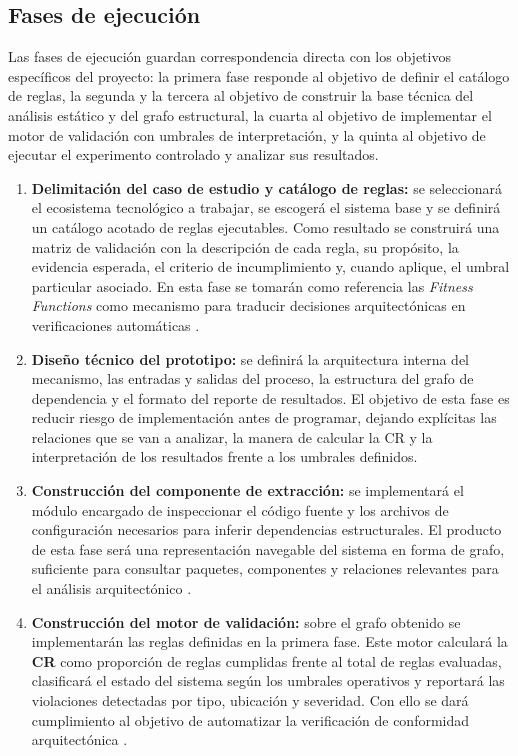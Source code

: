 \subsection{Fases de ejecución}

Las fases de ejecución guardan correspondencia directa con los objetivos específicos del proyecto: la primera fase responde al objetivo de definir el catálogo de reglas, la segunda y la tercera al objetivo de construir la base técnica del análisis estático y del grafo estructural, la cuarta al objetivo de implementar el motor de validación con umbrales de interpretación, y la quinta al objetivo de ejecutar el experimento controlado y analizar sus resultados.

\begin{enumerate}
    \item \textbf{Delimitación del caso de estudio y catálogo de reglas:} se seleccionará el ecosistema tecnológico a trabajar, se escogerá el sistema base y se definirá un catálogo acotado de reglas ejecutables. Como resultado se construirá una matriz de validación con la descripción de cada regla, su propósito, la evidencia esperada, el criterio de incumplimiento y, cuando aplique, el umbral particular asociado. En esta fase se tomarán como referencia las \textit{Fitness Functions} como mecanismo para traducir decisiones arquitectónicas en verificaciones automáticas \parencite{PaulWang2019, FitnessF}.

    \item \textbf{Diseño técnico del prototipo:} se definirá la arquitectura interna del mecanismo, las entradas y salidas del proceso, la estructura del grafo de dependencia y el formato del reporte de resultados. El objetivo de esta fase es reducir riesgo de implementación antes de programar, dejando explícitas las relaciones que se van a analizar, la manera de calcular la CR y la interpretación de los resultados frente a los umbrales definidos.

    \item \textbf{Construcción del componente de extracción:} se implementará el módulo encargado de inspeccionar el código fuente y los archivos de configuración necesarios para inferir dependencias estructurales. El producto de esta fase será una representación navegable del sistema en forma de grafo, suficiente para consultar paquetes, componentes y relaciones relevantes para el análisis arquitectónico \parencite{Klein2022, Murphy2001}.

    \item \textbf{Construcción del motor de validación:} sobre el grafo obtenido se implementarán las reglas definidas en la primera fase. Este motor calculará la \textbf{CR} como proporción de reglas cumplidas frente al total de reglas evaluadas, clasificará el estado del sistema según los umbrales operativos y reportará las violaciones detectadas por tipo, ubicación y severidad. Con ello se dará cumplimiento al objetivo de automatizar la verificación de conformidad arquitectónica \parencite{PaulWang2019, ArchUnit}.


\end{enumerate}
